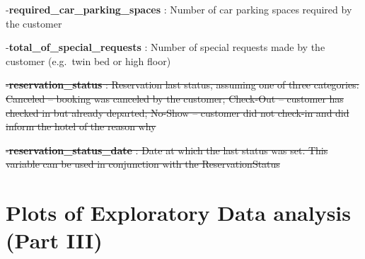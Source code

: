 \documentclass[10pt,a4paper]{article}
\theoremstyle{break}
\begin{document}
-\textbf{required\_car\_parking\_spaces} : Number of car parking spaces required by the customer

-\textbf{total\_of\_special\_requests} : Number of special requests made by the customer (e.g.~twin bed or high floor)

\sout{-\textbf{reservation\_status} : Reservation last status, assuming one of three categories: Canceled – booking was canceled by the customer; Check-Out – customer has checked in but already departed; No-Show – customer did not check-in and did inform the hotel of the reason why}

\sout{-\textbf{reservation\_status\_date} : Date at which the last status was set. This variable can be used in conjunction with the ReservationStatus}

\newpage

\hypertarget{annexe:annexe4}{%
\section{Plots of Exploratory Data analysis (Part III)}\label{annexe:annexe4}}
\end{document}
